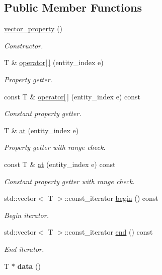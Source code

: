 \subsection*{Public Member Functions}
\begin{DoxyCompactItemize}
\item 
\hyperlink{classophidian_1_1entity__system_1_1vector__property_a496d8541dd8b5f30f8ad0895103db195}{vector\-\_\-property} ()
\begin{DoxyCompactList}\small\item\em Constructor. \end{DoxyCompactList}\item 
T \& \hyperlink{classophidian_1_1entity__system_1_1vector__property_ae74e2a7810409a4ae4b64d924342ff7f}{operator\mbox{[}$\,$\mbox{]}} (entity\-\_\-index e)
\begin{DoxyCompactList}\small\item\em Property getter. \end{DoxyCompactList}\item 
const T \& \hyperlink{classophidian_1_1entity__system_1_1vector__property_ac208bfcebb8bbc95facab6bfa0071691}{operator\mbox{[}$\,$\mbox{]}} (entity\-\_\-index e) const 
\begin{DoxyCompactList}\small\item\em Constant property getter. \end{DoxyCompactList}\item 
T \& \hyperlink{classophidian_1_1entity__system_1_1vector__property_ad8a02ea98fb22534a4d1f36eefab7838}{at} (entity\-\_\-index e)
\begin{DoxyCompactList}\small\item\em Property getter with range check. \end{DoxyCompactList}\item 
const T \& \hyperlink{classophidian_1_1entity__system_1_1vector__property_a09c2b43e6a9ee44ed65cc367dd15af0b}{at} (entity\-\_\-index e) const 
\begin{DoxyCompactList}\small\item\em Constant property getter with range check. \end{DoxyCompactList}\item 
std\-::vector$<$ T $>$\-::const\-\_\-iterator \hyperlink{classophidian_1_1entity__system_1_1vector__property_a626598dfceff63015555d40e7b150b46}{begin} () const 
\begin{DoxyCompactList}\small\item\em Begin iterator. \end{DoxyCompactList}\item 
std\-::vector$<$ T $>$\-::const\-\_\-iterator \hyperlink{classophidian_1_1entity__system_1_1vector__property_a3e5adc4e4c7bc89b1226f7493131e017}{end} () const 
\begin{DoxyCompactList}\small\item\em End iterator. \end{DoxyCompactList}\item 
\hypertarget{classophidian_1_1entity__system_1_1vector__property_aeff3ad843abcfab284492496ddb0963d}{T $\ast$ {\bfseries data} ()}\label{classophidian_1_1entity__system_1_1vector__property_aeff3ad843abcfab284492496ddb0963d}


\end{DoxyCompactItemize}
